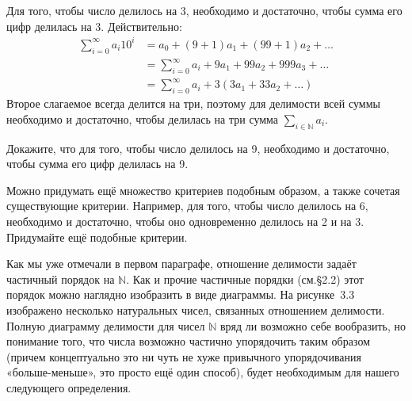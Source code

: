 \begin{example}
Для того, чтобы число делилось на 3, необходимо и достаточно, чтобы сумма его цифр делилась на 3. Действительно:
\begin{align*}
\sum_{i=0}^\infty a_i 10^i &= a_0 + (9+1)a_1 + (99+1)a_2 + \ldots\\
    &= \sum_{i=0}^\infty a_i + 9a_1 + 99a_2 + 999a_3 +\ldots \\
    &= \sum_{i=0}^\infty a_i + 3(3a_1 + 33a_2 +\ldots)
\end{align*}
Второе слагаемое всегда делится на три, поэтому для делимости всей суммы необходимо и достаточно, чтобы делилась на три сумма $\sum_{i\in\mathbb{N}} a_i$.
\end{example}

\begin{exercise}
Докажите, что для того, чтобы число делилось на 9, необходимо и достаточно, чтобы сумма его цифр делилась на 9.
\end{exercise}

\begin{example}
Можно придумать ещё множество критериев подобным образом, а также сочетая существующие критерии. Например, для того, чтобы число делилось на 6, необходимо и достаточно, чтобы оно одновременно делилось на 2 и на 3. Придумайте ещё подобные критерии.
\end{example}

Как мы уже отмечали в первом параграфе, отношение делимости задаёт частичный порядок на $\mathbb{N}$. Как и прочие частичные порядки (см.\S2.2) этот порядок можно наглядно изобразить в виде диаграммы. На рисунке~3.3 изображено несколько натуральных чисел, связанных отношением делимости. Полную диаграмму делимости для чисел $\mathbb{N}$ вряд ли возможно себе вообразить, но понимание того, что числа возможно частично упорядочить таким образом (причем концептуально это ни чуть не хуже привычного упорядочивания «больше-меньше», это просто ещё один способ), будет необходимым для нашего следующего определения.

